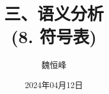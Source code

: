 \documentclass[]{beamer}
\title[语义分析]{三、语义分析\\ (8. 符号表)}
\author[魏恒峰]{\large 魏恒峰}
\institute{hfwei@nju.edu.cn}
\date{2024年04月12日}
\begin{document}
\maketitle


\thankyou{}

\end{document}
